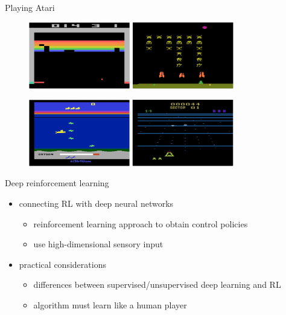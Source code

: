 \begin{frame}{Playing Atari}
    \begin{figure}
        \centering
        \includegraphics[width=0.8\textwidth]{atari-ex1.png}
    \end{figure}
    \begin{figure}
        \centering
        \includegraphics[width=0.8\textwidth]{atari-ex2.png}
    \end{figure}
\end{frame}

\begin{frame}{Deep reinforcement learning}
    \begin{itemize}\itemsep=12pt

        \item connecting RL with deep neural networks
        \vspace*{0.5em}
        \begin{itemize}
            \item reinforcement learning approach to obtain control policies
            \item use high-dimensional sensory input
        \end{itemize}

        \item practical considerations
        \vspace*{0.5em}
        \begin{itemize}
            \item differences between supervised/unsupervised deep learning and RL
            \item algorithm must learn like a human player
        \end{itemize}

    \end{itemize}
\end{frame}

